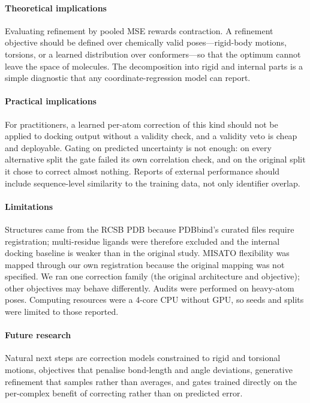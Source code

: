 \documentclass[preprint,12pt,authoryear]{elsarticle}
\begin{document}
\paragraph{Theoretical implications} Evaluating refinement by pooled MSE rewards contraction. A refinement objective should
be defined over chemically valid poses---rigid-body motions, torsions, or a learned distribution over conformers---so that the
optimum cannot leave the space of molecules. The decomposition into rigid and internal parts is a simple diagnostic that any
coordinate-regression model can report.

\paragraph{Practical implications} For practitioners, a learned per-atom correction of this kind should not be applied to
docking output without a validity check, and a validity veto is cheap and deployable. Gating on predicted uncertainty is not
enough: on every alternative split the gate failed its own correlation check, and on the original split it chose to correct
almost nothing. Reports of
external performance should include sequence-level similarity to the training data, not only identifier overlap.

\paragraph{Limitations} Structures came from the RCSB PDB because PDBbind's curated files require registration; multi-residue
ligands were therefore excluded and the internal docking baseline is weaker than in the original study. MISATO flexibility was
mapped through our own registration because the original mapping was not specified. We ran one correction family (the original
architecture and objective); other objectives may behave differently. Audits were performed on heavy-atom poses. Computing
resources were a 4-core CPU without GPU, so seeds and splits were limited to those reported.

\paragraph{Future research} Natural next steps are correction models constrained to rigid and torsional motions, objectives
that penalise bond-length and angle deviations, generative refinement that samples rather than averages, and gates trained
directly on the per-complex benefit of correcting rather than on predicted error.
\end{document}
